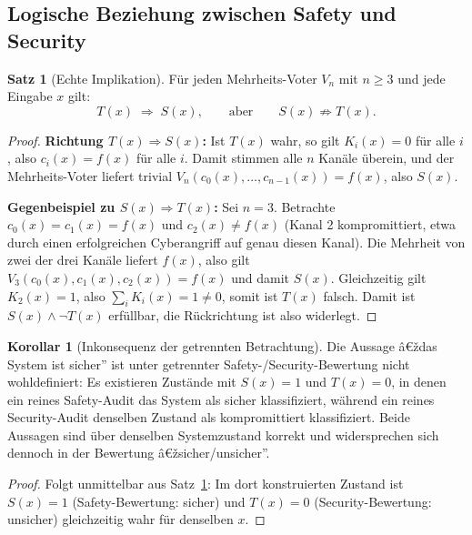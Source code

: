 ﻿\documentclass[a4paper,12pt]{article}
\theoremstyle{definition}
\newtheorem{satz}{Satz}
\newtheorem{korollar}{Korollar}
\begin{document}
\subsection{Logische Beziehung zwischen Safety und Security}

\begin{satz}[Echte Implikation]
	\label{satz:implikation}
	Für jeden Mehrheits-Voter $V_n$ mit $n \geq 3$ und jede Eingabe $x$ gilt:
	\[
	T(x) \;\Rightarrow\; S(x), \qquad \text{aber} \qquad S(x) \not\Rightarrow T(x).
	\]
\end{satz}

\begin{proof}
	\textbf{Richtung $T(x) \Rightarrow S(x)$:} Ist $T(x)$ wahr, so gilt $K_i(x) = 0$ für alle $i$, also $c_i(x) = f(x)$ für alle $i$. Damit stimmen alle $n$ Kanäle überein, und der Mehrheits-Voter liefert trivial $V_n(c_0(x),\ldots,c_{n-1}(x)) = f(x)$, also $S(x)$.

	\textbf{Gegenbeispiel zu $S(x) \Rightarrow T(x)$:} Sei $n = 3$. Betrachte $c_0(x) = c_1(x) = f(x)$ und $c_2(x) \neq f(x)$ (Kanal 2 kompromittiert, etwa durch einen erfolgreichen Cyberangriff auf genau diesen Kanal). Die Mehrheit von zwei der drei Kanäle liefert $f(x)$, also gilt $V_3(c_0(x),c_1(x),c_2(x)) = f(x)$ und damit $S(x)$. Gleichzeitig gilt $K_2(x) = 1$, also $\sum_i K_i(x) = 1 \neq 0$, somit ist $T(x)$ falsch. Damit ist $S(x) \wedge \neg T(x)$ erfüllbar, die Rückrichtung ist also widerlegt. \qedhere
\end{proof}

\begin{korollar}[Inkonsequenz der getrennten Betrachtung]
	\label{kor:inkonsequenz}
	Die Aussage â€ždas System ist sicher'' ist unter getrennter Safety-/Security-Bewertung nicht wohldefiniert: Es existieren Zustände mit $S(x) = 1$ und $T(x) = 0$, in denen ein reines Safety-Audit das System als sicher klassifiziert, während ein reines Security-Audit denselben Zustand als kompromittiert klassifiziert. Beide Aussagen sind über denselben Systemzustand korrekt und widersprechen sich dennoch in der Bewertung â€žsicher/unsicher''.
\end{korollar}

\begin{proof}
	Folgt unmittelbar aus Satz~\ref{satz:implikation}: Im dort konstruierten Zustand ist $S(x)=1$ (Safety-Bewertung: sicher) und $T(x)=0$ (Security-Bewertung: unsicher) gleichzeitig wahr für denselben $x$. \qedhere
\end{proof}
\end{document}
